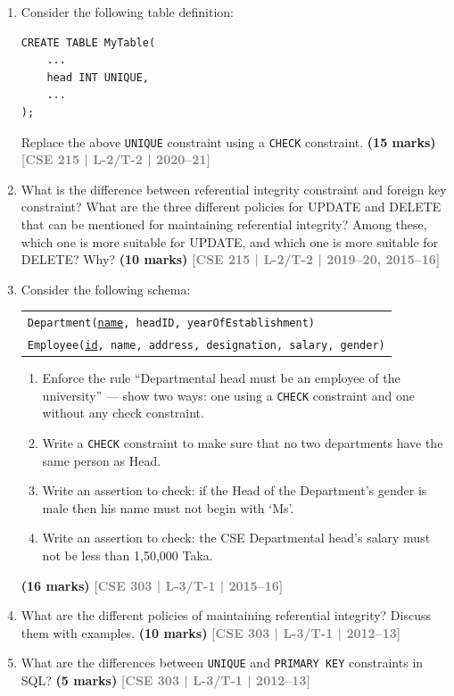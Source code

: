 \documentclass[12pt]{article}
\newcommand{\yr}[1]{\hfill\textcolor{gray}{\small\textbf{[#1]}}}
\newcommand{\mk}[1]{\textcolor{orange!70!black}{\small\textbf{(#1 marks)}}}
\begin{document}
\begin{enumerate}
\item Consider the following table definition:
\begin{lstlisting}
CREATE TABLE MyTable(
    ...
    head INT UNIQUE,
    ...
);
\end{lstlisting}
Replace the above \texttt{UNIQUE} constraint using a \texttt{CHECK} constraint.
\mk{15} \yr{CSE 215 | L-2/T-2 | 2020--21}



\item What is the difference between referential integrity constraint and foreign key constraint? What are the three different policies for UPDATE and DELETE that can be mentioned for maintaining referential integrity? Among these, which one is more suitable for UPDATE, and which one is more suitable for DELETE? Why?
\mk{10} \yr{CSE 215 | L-2/T-2 | 2019--20, 2015--16}

\item Consider the following schema:
\begin{center}
\begin{tabular}{l}
\texttt{Department(\underline{name}, headID, yearOfEstablishment)}\\
\texttt{Employee(\underline{id}, name, address, designation, salary, gender)}
\end{tabular}
\end{center}
\begin{enumerate}
  \item Enforce the rule ``Departmental head must be an employee of the university'' --- show two ways: one using a \texttt{CHECK} constraint and one without any check constraint.
  \item Write a \texttt{CHECK} constraint to make sure that no two departments have the same person as Head.
  \item Write an assertion to check: if the Head of the Department's gender is male then his name must not begin with `Ms'.
  \item Write an assertion to check: the CSE Departmental head's salary must not be less than 1,50,000 Taka.
\end{enumerate}
\mk{16} \yr{CSE 303 | L-3/T-1 | 2015--16}



\item What are the different policies of maintaining referential integrity? Discuss them with examples.
\mk{10} \yr{CSE 303 | L-3/T-1 | 2012--13}


\item What are the differences between \texttt{UNIQUE} and \texttt{PRIMARY KEY} constraints in SQL?
\mk{5} \yr{CSE 303 | L-3/T-1 | 2012--13}



\end{enumerate}
\end{document}
